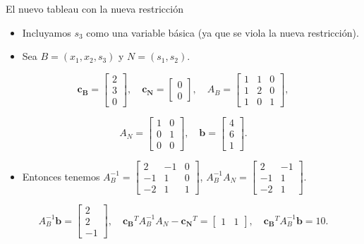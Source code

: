 \documentclass{beamer}
\begin{document}
\begin{frame}{El nuevo tableau con la nueva restricción}
    \begin{itemize}
        \item Incluyamos \( s_3 \) como una variable básica (ya que se viola la nueva restricción).
        \item Sea \( B = (x_1, x_2, s_3) \) y \( N = (s_1, s_2) \).
    \end{itemize}

    \[
    \mathbf{c_B} = 
    \begin{bmatrix}
        2 \\ 3 \\ 0
    \end{bmatrix}, \quad
    \mathbf{c_N} = 
    \begin{bmatrix}
        0 \\ 0
    \end{bmatrix}, \quad
    A_B = 
    \begin{bmatrix}
        1 & 1 & 0 \\
        1 & 2 & 0 \\
        1 & 0 & 1
    \end{bmatrix},
    \]
    
    \[
    A_N = 
    \begin{bmatrix}
        1 & 0 \\
        0 & 1 \\
        0 & 0
    \end{bmatrix}, \quad
    \mathbf{b} = 
    \begin{bmatrix}
        4 \\ 6 \\ 1
    \end{bmatrix}.
    \]

    \begin{itemize}
        \item Entonces tenemos \( A_B^{-1} = 
        \begin{bmatrix}
            2 & -1 & 0 \\
            -1 & 1 & 0 \\
            -2 & 1 & 1
        \end{bmatrix} \), \quad
        \( A_B^{-1} A_N = 
        \begin{bmatrix}
            2 & -1 \\
            -1 & 1 \\
            -2 & 1
        \end{bmatrix} \).
    \end{itemize}

    \[
    A_B^{-1} \mathbf{b} = 
    \begin{bmatrix}
        2 \\ 2 \\ -1
    \end{bmatrix}, \quad
    \mathbf{c_B}^T A_B^{-1} A_N - \mathbf{c_N}^T = 
    \begin{bmatrix}
        1 & 1
    \end{bmatrix}, \quad
    \mathbf{c_B}^T A_B^{-1} \mathbf{b} = 10.
    \]
\end{frame}
\end{document}
